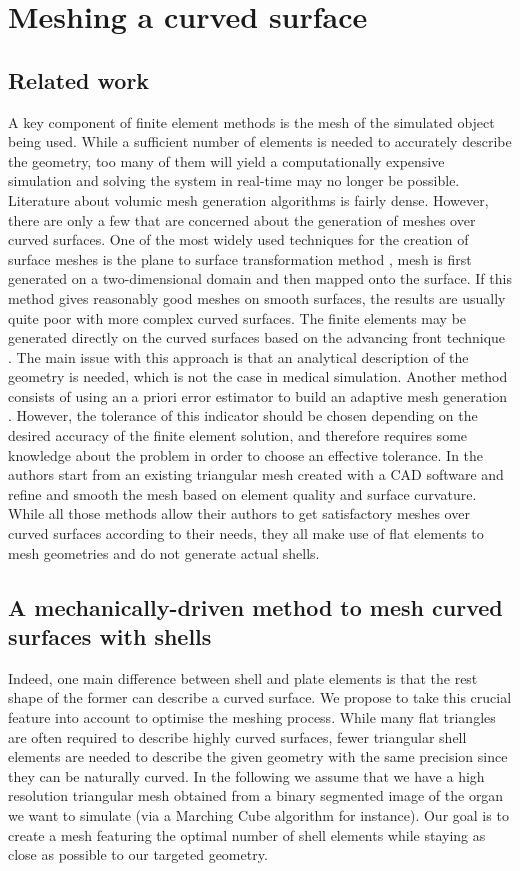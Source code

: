 \documentclass{llncs}
\begin{document}
\section{Meshing a curved surface}
\label{sec:mesh}
\subsection{Related work}

A key component of finite element methods is the mesh of the simulated object being used. While a sufficient number of elements is needed to accurately describe the geometry, too many of them will yield a computationally expensive simulation and solving the system in real-time may no longer be possible. Literature about volumic mesh generation algorithms is fairly dense. However, there are only a few that are concerned about the generation of meshes over curved surfaces. One of the most widely used techniques for the creation of surface meshes is the plane to surface transformation method \cite{Zienkiewicz71}, mesh is first generated on a two-dimensional domain and then mapped onto the surface. If this method gives reasonably good meshes on smooth surfaces, the results are usually quite poor with more complex curved surfaces. The finite elements may be generated directly on the curved surfaces based on the advancing front technique \cite{Lo85,Lau96}. The main issue with this approach is that an analytical description of the geometry is needed, which is not the case in medical simulation. Another method consists of using an a priori error estimator to build an adaptive mesh generation \cite{Baumann97}. However, the tolerance of this indicator should be chosen depending on the desired accuracy of the finite element solution, and therefore requires some knowledge about the problem in order to choose an effective tolerance. In \cite{Bechet02} the authors start from an existing triangular mesh created with a CAD software and refine and smooth the mesh based on element quality and surface curvature. While all those methods allow their authors to get satisfactory meshes over curved surfaces according to their needs, they all make use of flat elements to mesh geometries and do not generate actual shells. 

\subsection{A mechanically-driven method to mesh curved surfaces with shells}

Indeed, one main difference between shell and plate elements is that the rest shape of the former can describe a curved surface. We propose to take this crucial feature into account to optimise the meshing process. While many flat triangles are often required to describe highly curved surfaces, fewer triangular shell elements are needed to describe the given geometry with the same precision since they can be naturally curved. In the following we assume that we have a high resolution triangular mesh obtained from a binary segmented image of the organ we want to simulate (via a Marching Cube algorithm for instance). Our goal is to create a mesh featuring the optimal number of shell elements while staying as close as possible to our targeted geometry. 
\end{document}

